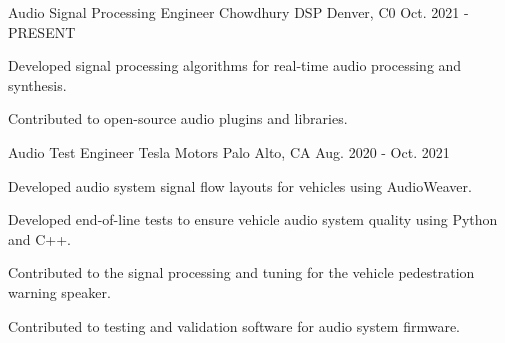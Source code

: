 

\begin{cventries}

  \cventry
    {Audio Signal Processing Engineer} %
    {Chowdhury DSP} %
    {Denver, C0} %
    {Oct. 2021 - PRESENT} %
    {
      \begin{cvitems} %
        \item {Developed signal processing algorithms for real-time audio processing and synthesis.}
        \item {Contributed to open-source audio plugins and libraries.}
      \end{cvitems}
    }

  \cventry
    {Audio Test Engineer} %
    {Tesla Motors} %
    {Palo Alto, CA} %
    {Aug. 2020 - Oct. 2021} %
    {
      \begin{cvitems} %
        \item {Developed audio system signal flow layouts for vehicles using AudioWeaver.}
        \item {Developed end-of-line tests to ensure vehicle audio system quality using Python and C++.}
        \item {Contributed to the signal processing and tuning for the vehicle pedestration warning speaker.}
        \item {Contributed to testing and validation software for audio system firmware.}
      \end{cvitems}
    }


\end{cventries}
